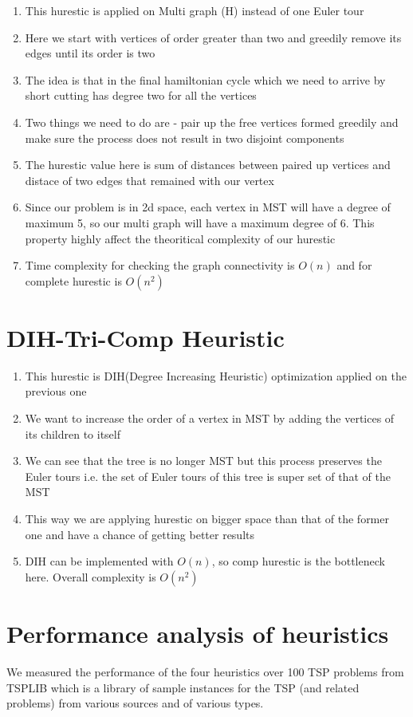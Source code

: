 \begin{enumerate}
    \item This hurestic is applied on Multi graph (H) instead of one Euler tour
    \item Here we start with vertices of order greater than two and greedily remove its edges until its order is two
    \item The idea is that in the final hamiltonian cycle which we need to arrive by short cutting has degree two for all the vertices
    \item Two things we need to do are - pair up the free vertices formed greedily and make sure the process does not result in two disjoint components
    \item The hurestic value here is sum of distances between paired up vertices and distace of two edges that remained with our vertex
    \item Since our problem is in 2d space, each vertex in MST will have a degree of maximum 5, so our multi graph will have a maximum degree of 6. This property highly affect the theoritical complexity of our hurestic
    \item Time complexity for checking the graph connectivity is $O(n)$ and for complete hurestic is $O(n^2)$
\end{enumerate}

\section{DIH-Tri-Comp Heuristic}

\begin{enumerate}
    \item This hurestic is DIH(Degree Increasing Heuristic) optimization applied on the previous one
    \item We want to increase the order of a vertex in MST by adding the vertices  of its children to itself
    \item We can see that the tree is no longer MST but this process preserves the Euler tours i.e. the set of Euler tours of this tree is super set of that of the MST
    \item This way we are applying hurestic on bigger space than that of the former one and have a chance of getting better results
    \item  DIH can be implemented with $O(n)$, so comp hurestic is the bottleneck here. Overall complexity is $O(n^2)$
\end{enumerate}


\section{Performance analysis of heuristics}

We measured the performance of the four heuristics over 100 TSP problems from TSPLIB which is a library of sample instances for the TSP (and related problems) from various sources and of various types.



